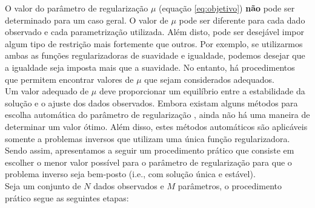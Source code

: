 O valor do parâmetro de regularização $\mu$ (equação \ref{eq:objetivo}) {\bf não}
pode ser determinado para um caso geral.
O valor de $\mu$ pode ser diferente para cada dado observado e cada parametrização
utilizada.
Além disto, pode ser desejável impor algum tipo de restrição mais fortemente
que outros. Por exemplo, se utilizarmos ambas as funções regularizadoras de
suavidade e igualdade, podemos desejar que a igualdade seja imposta mais que a
suavidade. No entanto, há procedimentos que permitem encontrar valores de $\mu$
que sejam considerados adequados. 
\\
\indent Um valor adequado de $\mu$ deve proporcionar um equilíbrio entre
a estabilidade da solução e o ajuste dos dados observados.
Embora existam alguns métodos para escolha automática do parâmetro de regularização
\citep{aster_etal2005}, ainda não há uma maneira de determinar um valor ótimo.
Além disso, estes métodos automáticos são aplicáveis somente a problemas inversos
que utilizam uma única função regularizadora.
Sendo assim, apresentamos a seguir um procedimento prático que consiste em escolher o
menor valor possível para o parâmetro de regularização para que o problema
inverso seja bem-posto (i.e., com solução única e estável).
\\
\indent Seja um conjunto de $N$ dados observados e $M$ parâmetros,
o procedimento prático segue as seguintes etapas:

